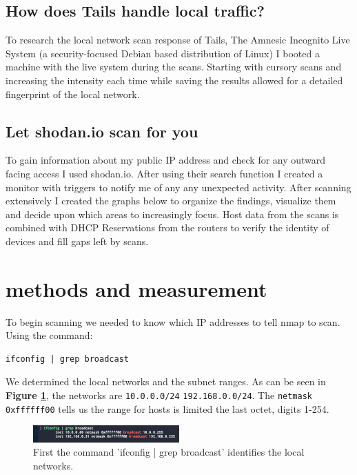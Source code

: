 \documentclass[10pt]{article}
\begin{document}
\subsection*{How does Tails handle local traffic?}

To research the local network scan response of Tails, The Amnesic Incognito Live System (a security-focused Debian based distribution of Linux) I booted a machine 
with the live system during the scans. Starting with cursory scans and increasing the intensity each time while saving the results allowed for a detailed fingerprint of the local network. 

\subsection*{Let shodan.io scan for you}

To gain information about my public IP address and check for any outward facing access I used shodan.io. 
After using their search function I created a monitor with triggers to notify me of any any unexpected activity. After scanning extensively I created the graphs below to organize the findings, visualize them and decide upon which areas to increasingly 
focus. Host data from the scans is combined with DHCP Reservations from the routers to verify the identity of devices and fill gaps left by scans.

\section*{methods and measurement}
To begin scanning we needed to know which IP addresses to tell nmap to scan. Using the command: \begin{verbatim}ifconfig | grep broadcast\end{verbatim} 
We determined the local networks and the subnet ranges. As can be seen in \textbf{Figure \ref{ifconfig image}}, the networks are \verb|10.0.0.0/24|
\verb|192.168.0.0/24|. The \verb|netmask 0xffffff00| tells us the range for hosts is limited the last octet, digits 1-254.

\begin{figure}[H]
\centering
\includegraphics[width=0.5\textwidth]{ifconfig.png}
\caption{First the command 'ifconfig | grep broadcast' identifies the local networks.}\label{ifconfig image}
\end{figure}
\end{document}
